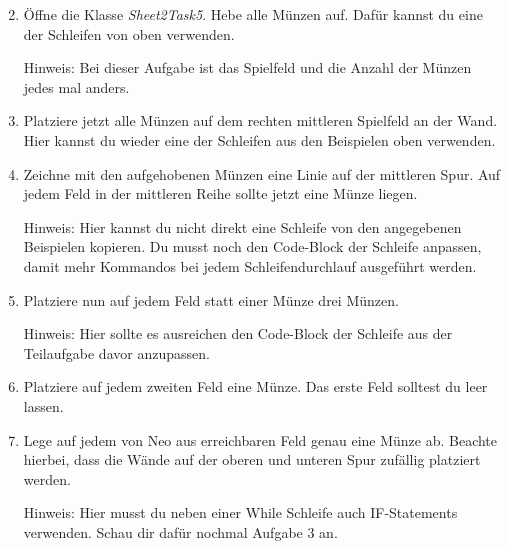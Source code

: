 \begin{enumerate} \setcounter{enumi}{1}
    \item Öffne die Klasse \textit{Sheet2Task5}. 
        Hebe alle Münzen auf.
        Dafür kannst du eine der Schleifen von oben verwenden.

        Hinweis: Bei dieser Aufgabe ist das Spielfeld und die Anzahl der Münzen jedes mal anders.
    \item Platziere jetzt alle Münzen auf dem rechten mittleren Spielfeld an der Wand. 
        Hier kannst du wieder eine der Schleifen aus den Beispielen oben verwenden.
    \item Zeichne mit den aufgehobenen Münzen eine Linie auf der mittleren Spur. 
        Auf jedem Feld in der mittleren Reihe sollte jetzt eine Münze liegen.

        Hinweis: Hier kannst du nicht direkt eine Schleife von den angegebenen Beispielen kopieren.
        Du musst noch den Code-Block der Schleife anpassen, damit mehr Kommandos bei jedem Schleifendurchlauf ausgeführt werden.
    \item Platziere nun auf jedem Feld statt einer Münze drei Münzen.
    
        Hinweis: Hier sollte es ausreichen den Code-Block der Schleife aus der Teilaufgabe davor anzupassen.
    \item Platziere auf jedem zweiten Feld eine Münze.
        Das erste Feld solltest du leer lassen.
    \item \optional Lege auf jedem von Neo aus erreichbaren Feld genau eine Münze ab. 
        Beachte hierbei, dass die Wände auf der oberen und unteren Spur zufällig platziert werden.

        Hinweis: Hier musst du neben einer While Schleife auch IF-Statements verwenden.
            Schau dir dafür nochmal Aufgabe 3 an.
\end{enumerate}
